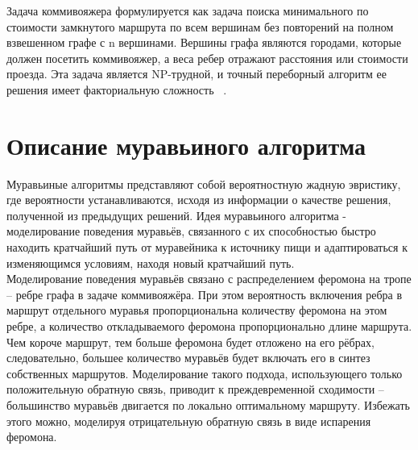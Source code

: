 \documentclass[12pt, a4paper]{report}
\begin{document}
	Задача коммивояжера формулируется как задача поиска минимального по стоимости замкнутого маршрута по всем вершинам без повторений
	на полном взвешенном графе с n вершинами. Вершины графа являются
	городами, которые должен посетить коммивояжер, а веса ребер отражают
	расстояния или стоимости проезда. Эта задача является NP-трудной, и точный переборный алгоритм ее решения имеет факториальную сложность ~\cite{kom}.

	\section{Описание муравьиного алгоритма}
	
	Муравьиные алгоритмы представляют собой вероятностную жадную эвристику, где вероятности устанавливаются, исходя из информации о качестве решения, полученной из предыдущих решений. Идея муравьиного алгоритма - моделирование поведения муравьёв, связанного с их способностью быстро находить кратчайший путь от муравейника к источнику пищи
	и адаптироваться к изменяющимся условиям, находя новый кратчайший
	путь.\\
	
	Моделирование поведения муравьёв связано с распределением феромона на тропе – ребре графа в задаче коммивояжёра. При этом вероятность включения ребра в маршрут отдельного муравья пропорциональна количеству феромона на этом ребре, а количество откладываемого феромона
	пропорционально длине маршрута. Чем короче маршрут, тем больше феромона будет отложено на его рёбрах, следовательно, большее количество муравьёв будет включать его в синтез собственных маршрутов. Моделирование такого подхода, использующего только положительную обратную
	связь, приводит к преждевременной сходимости – большинство муравьёв двигается по локально оптимальному маршруту. Избежать этого можно, моделируя отрицательную обратную связь в виде испарения феромона.\\
	
\end{document}
